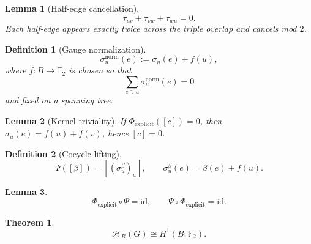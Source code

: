 \documentclass[11pt]{article}
\newtheorem{lemma}{Lemma}
\newtheorem{definition}{Definition}
\newtheorem{theorem}{Theorem}
\begin{document}
\begin{lemma}[Half-edge cancellation]
\[
\tau_{uv}+\tau_{vw}+\tau_{wu}=0.
\]
Each half-edge appears exactly twice across the triple overlap and cancels mod $2$.
\end{lemma}

\begin{definition}[Gauge normalization]
\[
\sigma_u^{\mathrm{norm}}(e):=\sigma_u(e)+f(u),
\]
where $f:B\to\mathbb F_2$ is chosen so that
\[
\sum_{e\ni u}\sigma_u^{\mathrm{norm}}(e)=0
\]
and fixed on a spanning tree.
\end{definition}

\begin{lemma}[Kernel triviality]
If $\Phi_{\mathrm{explicit}}([c])=0$, then $\sigma_u(e)=f(u)+f(v)$, hence $[c]=0$.
\end{lemma}

\begin{definition}[Cocycle lifting]
\[
\Psi([\beta])=[(\sigma_u^\beta)_u],\qquad
\sigma_u^\beta(e)=\beta(e)+f(u).
\]
\end{definition}

\begin{lemma}
\[
\Phi_{\mathrm{explicit}}\circ\Psi=\mathrm{id},\qquad
\Psi\circ\Phi_{\mathrm{explicit}}=\mathrm{id}.
\]
\end{lemma}

\begin{theorem}
\[
\mathcal H_R(G)\cong H^1(B;\mathbb F_2).
\]
\end{theorem}
\end{document}
